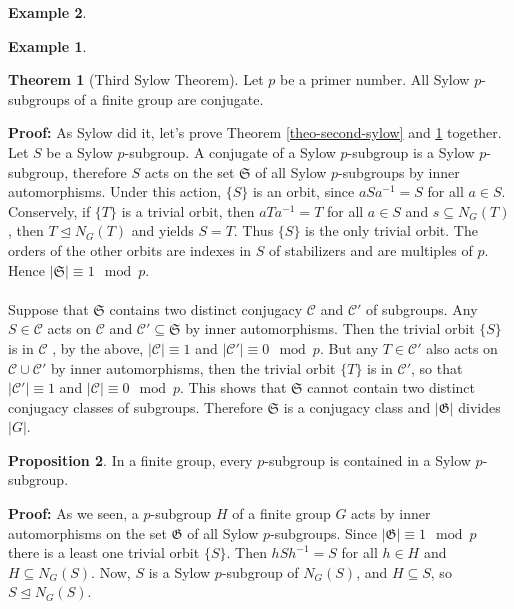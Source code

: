 \documentclass[11pt]{amsbook}%
\theoremstyle{plain}
\theoremstyle{definition}
\newtheorem*{example*}{Example}
\newtheorem{proposition}[theorem]{Proposition}
\newtheorem{theorem}{Theorem}
\numberwithin{equation}{section}
\newcommand{\CK}{\mathcal C}
\renewcommand{\proof}{ \textbf{Proof: }}
\newcommand{\leftnormal}{\trianglelefteq}
\begin{document}
\begin{example*}
\begin{example*}
\begin{theorem}[Third Sylow Theorem]
  \label{theo-third-sylow}
  Let $p$ be a primer number. All Sylow $p$-subgroups of a finite group are conjugate.
\end{theorem} \vspace{1.8em}
\proof As Sylow did it, let's prove Theorem \ref{theo-second-sylow} and \ref{theo-third-sylow} together.
Let $S$ be a Sylow $p$-subgroup. A conjugate of a Sylow $p$-subgroup is a Sylow $p$-subgroup, therefore
$S$ acts on the set $\mathfrak{S}$ of all Sylow $p$-subgroups by inner automorphisms. Under this action,
$\{S\}$ is an orbit, since $aSa^{-1} = S$ for all $a \in S$. Conservely, if $\{T\}$ is a trivial orbit, then
$aTa^{-1} = T$ for all $a \in S$ and $s \subseteq N_{G}(T)$, then $T \leftnormal N_{G}(T)$ and yields $S = T$.
Thus $\{S\}$ is the only trivial orbit. The orders of the other orbits are indexes in $S$ of stabilizers and
are multiples of $p$. Hence $|\mathfrak{S}| \equiv 1 \mod p$. \\ \\
Suppose that $\mathfrak{S}$ contains two distinct conjugacy $\mathcal{C}$ and $\mathcal{C}'$ of subgroups.
Any $S \in \mathcal{C}$ acts on $\mathcal{C}$ and $\mathcal{C}' \subseteq \mathfrak{S}$ by inner automorphisms.
Then the trivial orbit $\{S\}$ is in $\CK$ , by the above, $|\CK| \equiv 1$ and $|\CK'| \equiv 0 \mod p$.
But any $T \in \CK'$ also acts on $\CK \cup \CK'$ by inner automorphisms, then the trivial orbit $\{T\}$
is in $\CK'$, so that $|\CK'| \equiv 1$ and $|\CK| \equiv 0 \mod p$. This shows that $\mathfrak{S}$
cannot contain two distinct conjugacy classes of subgroups. Therefore $\mathfrak{S}$ is a conjugacy class
and $|\mathfrak{G}|$ divides $|G|$. \qedsymbol

\begin{proposition}
  \label{prop-p-contained}
  In a finite group, every $p$-subgroup is contained in a Sylow $p$-subgroup.
\end{proposition} \vspace{1.8em}
\proof As we seen, a $p$-subgroup $H$ of a finite group $G$ acts by inner automorphisms on the set
$\mathfrak{G}$ of all Sylow $p$-subgroups. Since $|\mathfrak{G}| \equiv 1 \mod p$ there is a least
one trivial orbit $\{S\}$. Then $hSh^{-1} = S$ for all $h \in H$ and $H \subseteq N_{G}(S)$. Now,
$S$ is a Sylow $p$-subgroup of $N_{G}(S)$, and $H \subseteq S$, so $S \leftnormal N_{G}(S)$. \qedsymbol


\end{example*}
\end{example*}
\end{document}
